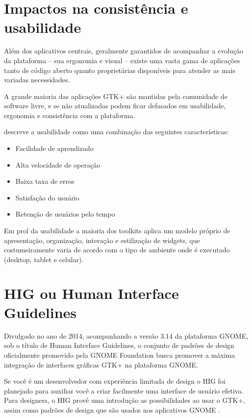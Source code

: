 \section{Impactos na consistência e usabilidade}

Além dos aplicativos centrais, geralmente garantidos de acompanhar a evolução
da plataforma -- sua ergonomia e visual -- existe uma vasta gama de aplicações
tanto de código aberto quanto proprietárias disponíveis para atender as mais
variadas necessidades.

A grande maioria das aplicações GTK+ são mantidas pela comunidade de software
livre, e se não atualizadas podem ficar defasados em usabilidade, ergonomia e
consistência com a plataforma.

 descreve a usabilidade como uma combinação
das seguintes características:

\begin{itemize}
    \item Facilidade de aprendizado
    \item Alta velocidade de operação
    \item Baixa taxa de erros
    \item Satisfação do usuário
    \item Retenção de usuários pelo tempo
\end{itemize}

Em prol da usabilidade a maioria dos toolkits aplica um modelo próprio de
apresentação, organização, interação e estilização de widgets, que
costumeiramente varia de acordo com o tipo de ambiente onde é executado
(desktop, tablet e celular).

\section{HIG ou Human Interface Guidelines}

Divulgado no ano de 2014, acompanhando a versão 3.14 da plataforma GNOME, sob o
título de Human Interface Guidelines, o conjunto de padrões de design
oficialmente promovido pela GNOME Foundation busca promover a máxima integração
de interfaces gráficas GTK+ na plataforma GNOME.

\begin{citacao}
    Se você é um desenvolvedor com experiência limitada de design o HIG foi
    planejado para auxiliar você a criar facilmente uma interface de usuário
    efetiva. Para designers, o HIG provê uma introdução as possibilidades ao 
    usar o GTK+, assim como padrões de design que são usados nos aplicativos
    GNOME \cite{gnome314hig}.
\end{citacao}

